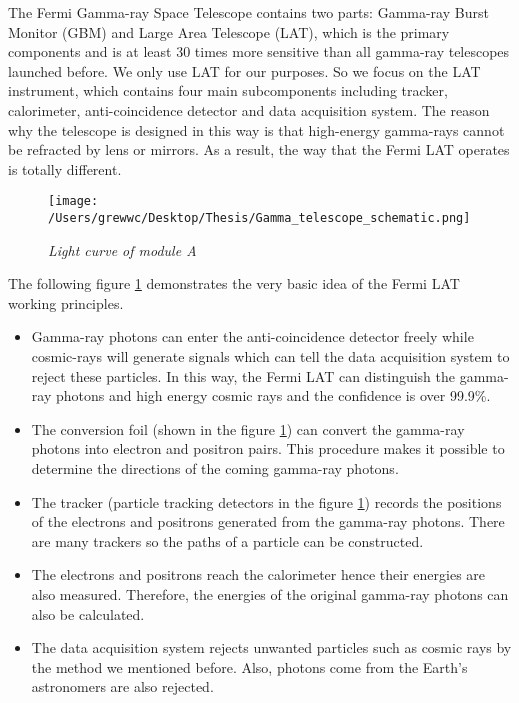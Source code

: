 \documentclass[12pt]{report}
\newcommand{\mycaption}[1]{\caption{\textit{\footnotesize #1}}}
\begin{document}
          The Fermi Gamma-ray Space Telescope contains two parts: Gamma-ray Burst Monitor (GBM) and Large 
          Area Telescope (LAT), which is the primary components and is at least 30 times more sensitive than 
          all gamma-ray telescopes launched before. We only use LAT for our purposes. So we 
          focus on the LAT instrument, which contains four main subcomponents including tracker, calorimeter,
          anti-coincidence detector and data acquisition system. The reason why the telescope is designed in 
          this way is that high-energy gamma-rays cannot be refracted by lens or mirrors. As a result, the way
          that the Fermi LAT operates is totally different. 

        \begin{figure}[!ht]  
          \begin{minipage}{1\textwidth}
            \begin{center} 
                \texttt{[image: /Users/grewwc/Desktop/Thesis/Gamma\_telescope\_schematic.png]}
                \mycaption{Light curve of module A}
                \label{fig:fermi schematic}
            \end{center}
          \end{minipage}
        \end{figure}
        The following figure \ref{fig:fermi schematic} demonstrates the very basic idea of the Fermi LAT working
        principles. \\

        \begin{itemize}
          \item Gamma-ray photons can enter the anti-coincidence detector freely while cosmic-rays will generate
            signals which can tell the data acquisition system to reject these particles. In this way, the 
            Fermi LAT can distinguish the gamma-ray photons and high energy cosmic rays and the confidence is 
            over 99.9\%. 
          \item The conversion foil (shown in the figure \ref{fig:fermi schematic}) can convert the 
            gamma-ray photons into electron and positron pairs. This procedure makes it possible to determine 
            the directions of the coming gamma-ray photons. 
          \item The tracker (particle tracking detectors in the figure \ref{fig:fermi schematic}) records the 
            positions of the electrons and positrons generated from the gamma-ray photons. There are many 
            trackers so the paths of a particle can be constructed.
          \item The electrons and positrons reach the calorimeter hence their energies are also measured.
            Therefore, the energies of the original gamma-ray photons can also be calculated. 
          \item The data acquisition system rejects unwanted particles such as cosmic rays by the method we mentioned 
            before. Also, photons come from the Earth's astronomers are also rejected. 
        \end{itemize}
\end{document}

